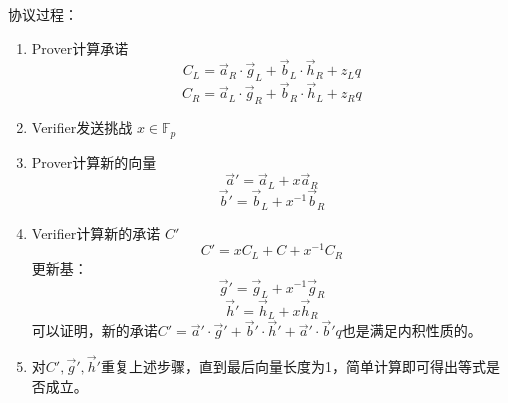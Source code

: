 \documentclass[10pt]{ctexart}
\begin{document}
协议过程：
\begin{enumerate}
    \item Prover计算承诺
        $$
        C_L = \vec{a}_R \cdot \vec{g}_L + \vec{b}_L \cdot \vec{h}_R + z_L q
        $$
        $$
        C_R = \vec{a}_L \cdot \vec{g}_R + \vec{b}_R \cdot \vec{h}_L + z_R q
        $$
    \item Verifier发送挑战 $x \in \mathbb{F}_p$
    \item Prover计算新的向量
        \begin{equation*}
            \vec{a}' = \vec{a}_L + x\vec{a}_R
        \end{equation*}
        \begin{equation*}
            \vec{b}' = \vec{b}_L + x^{-1}\vec{b}_R
        \end{equation*}
    \item Verifier计算新的承诺 $C'$
        \begin{equation*}
            C'  = x C_L + C + x^{-1}C_R
        \end{equation*}
        更新基：
        \begin{equation*}
            \vec{g}' = \vec{g}_L + x^{-1}\vec{g}_R
        \end{equation*}
        \begin{equation*}
            \vec{h}' = \vec{h}_L + x\vec{h}_R
        \end{equation*}
        可以证明，新的承诺$C' = \vec{a}' \cdot \vec{g}' + \vec{b}' \cdot \vec{h}' + \vec{a}' \cdot \vec{b}' q$也是满足内积性质的。
    \item 对$C',\vec{g}',\vec{h}'$重复上述步骤，直到最后向量长度为1，简单计算即可得出等式是否成立。
\end{enumerate}
\end{document}
